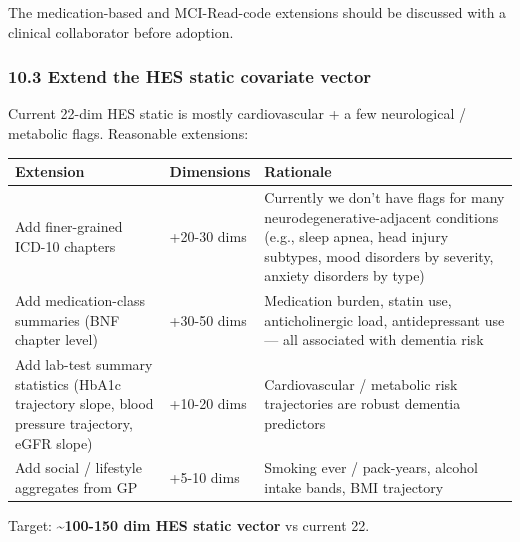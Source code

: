 \documentclass[
  11pt,
]{article}
\newcounter{none} %
\begin{document}
The medication-based and MCI-Read-code extensions should be discussed
with a clinical collaborator before adoption.

\subsubsection{10.3 Extend the HES static covariate
vector}\label{extend-the-hes-static-covariate-vector}

Current 22-dim HES static is mostly cardiovascular + a few neurological
/ metabolic flags. Reasonable extensions:

{\def\LTcaptype{none} %
\begin{longtable}[]{|>{\raggedright\arraybackslash}p{}|>{\raggedright\arraybackslash}p{}|>{\raggedright\arraybackslash}p{}|}
\hline
\begin{minipage}[b]{\linewidth}\raggedright
Extension
\end{minipage} & \begin{minipage}[b]{\linewidth}\raggedright
Dimensions
\end{minipage} & \begin{minipage}[b]{\linewidth}\raggedright
Rationale
\end{minipage} \\
\hline
\hline
\endhead
\hline
\endlastfoot
Add finer-grained ICD-10 chapters & +20-30 dims & Currently we don't
have flags for many neurodegenerative-adjacent conditions (e.g., sleep
apnea, head injury subtypes, mood disorders by severity, anxiety
disorders by type) \\
\hline
Add medication-class summaries (BNF chapter level) & +30-50 dims &
Medication burden, statin use, anticholinergic load, antidepressant use
--- all associated with dementia risk \\
\hline
Add lab-test summary statistics (HbA1c trajectory slope, blood pressure
trajectory, eGFR slope) & +10-20 dims & Cardiovascular / metabolic risk
trajectories are robust dementia predictors \\
\hline
Add social / lifestyle aggregates from GP & +5-10 dims & Smoking ever /
pack-years, alcohol intake bands, BMI trajectory \\
\hline
\end{longtable}
}

Target: \textbf{\textasciitilde100-150 dim HES static vector} vs current
22.
\end{document}
